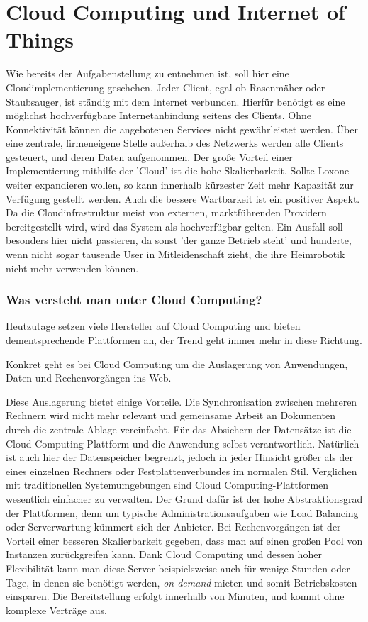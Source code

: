 \documentclass[letterpaper, 12pt]{article}
\let\tempsection\section
\renewcommand\section[1]{\vspace{-0.3cm}\tempsection{#1}\vspace{-0.3cm}}
\let\tempsubsubsection\subsubsection
\renewcommand\subsubsection[1]{\vspace{0cm}\tempsubsubsection{#1}\vspace{0cm}}
\begin{document}
\clearpage

\section{Cloud Computing und Internet of Things}


Wie bereits der Aufgabenstellung zu entnehmen ist, soll hier eine Cloudimplementierung geschehen. Jeder Client, egal ob Rasenmäher oder Staubsauger, ist ständig mit dem Internet verbunden. Hierfür benötigt es eine möglichst hochverfügbare Internetanbindung seitens des Clients. Ohne Konnektivität können die angebotenen Services nicht gewährleistet werden. Über eine zentrale, firmeneigene Stelle außerhalb des Netzwerks werden alle Clients gesteuert, und deren Daten aufgenommen. Der große Vorteil einer Implementierung mithilfe der 'Cloud' ist die hohe Skalierbarkeit. Sollte Loxone weiter expandieren wollen, so kann innerhalb kürzester Zeit mehr Kapazität zur Verfügung gestellt werden. Auch die bessere Wartbarkeit ist ein positiver Aspekt. Da die Cloudinfrastruktur meist von externen, marktführenden Providern bereitgestellt wird, wird das System als hochverfügbar gelten. Ein Ausfall soll besonders hier nicht passieren, da sonst 'der ganze Betrieb steht' und hunderte, wenn nicht sogar tausende User in Mitleidenschaft zieht, die ihre Heimrobotik nicht mehr verwenden können. \citep{ausarbeitungcc}

\subsubsection{Was versteht man unter Cloud Computing?}

Heutzutage setzen viele Hersteller auf Cloud Computing und bieten dementsprechende Plattformen an, der Trend geht immer mehr in diese Richtung. \begin{center}
Konkret geht es bei Cloud Computing um die Auslagerung von Anwendungen, Daten und Rechenvorgängen ins Web. \\
\end{center} 
Diese Auslagerung bietet einige Vorteile. Die Synchronisation zwischen mehreren Rechnern wird nicht mehr relevant und gemeinsame Arbeit an Dokumenten durch die zentrale Ablage vereinfacht. Für das Absichern der Datensätze ist die Cloud Computing-Plattform und die Anwendung selbst verantwortlich. Natürlich ist auch hier der Datenspeicher begrenzt, jedoch in jeder Hinsicht größer als der eines einzelnen Rechners oder Festplattenverbundes im normalen Stil. Verglichen mit traditionellen Systemumgebungen sind Cloud Computing-Plattformen wesentlich einfacher zu verwalten. Der Grund dafür ist der hohe Abstraktionsgrad der Plattformen, denn um typische Administrationsaufgaben wie Load Balancing oder Serverwartung kümmert sich der Anbieter. Bei Rechenvorgängen ist der Vorteil einer besseren Skalierbarkeit gegeben, dass man auf einen großen Pool von Instanzen zurückgreifen kann. Dank Cloud Computing und dessen hoher Flexibilität kann man diese Server beispielsweise auch für wenige Stunden oder Tage, in denen sie benötigt werden, \textit{on demand} mieten und somit Betriebskosten einsparen. Die Bereitstellung erfolgt innerhalb von Minuten, und kommt ohne komplexe Verträge aus.\cite{ausarbeitungcc}
\end{document}
